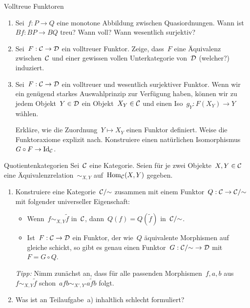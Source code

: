 \documentclass{uebblatt}
\begin{document}
\begin{aufgabe}{Volltreue Funktoren}
\begin{enumerate}
\item Sei~$f : P \to Q$ eine monotone Abbildung zwischen Quasiordnungen. Wann
ist~$Bf : BP \to BQ$ treu? Wann voll? Wann wesentlich surjektiv?
\item Sei~$F : \mathcal{C} \to \mathcal{D}$ ein volltreuer Funktor. Zeige, dass~$F$ eine Äquivalenz
zwischen~$\mathcal{C}$ und einer gewissen vollen Unterkategorie von~$\mathcal{D}$ (welcher?)
induziert.
\item Sei~$F : \mathcal{C} \to \mathcal{D}$ ein volltreuer und wesentlich surjektiver Funktor.
Wenn wir ein genügend starkes Auswahlprinzip zur Verfügung haben, können wir zu
jedem Objekt~$Y \in \mathcal{D}$ ein Objekt~$X_Y \in \mathcal{C}$ und einen
Iso~$g_Y : F(X_Y) \to Y$ wählen.

Erkläre, wie die Zuordnung~$Y \mapsto X_Y$ einen Funktor definiert. Weise die
Funk\-tor\-axiome explizit nach. Konstruiere einen natürlichen
Isomorphismus~$G \circ F \to \mathrm{Id}_{\mathcal{C}}$.
\end{enumerate}
\end{aufgabe}

\begin{aufgabe}{Quotientenkategorien}
Sei~$\mathcal{C}$ eine Kategorie. Seien für je zwei Objekte~$X,Y \in \mathcal{C}$ eine
Äquivalenzrelation~$\sim_{X,Y}$ auf~$\mathrm{Hom}_{\mathcal{C}}(X,Y)$ gegeben.
\begin{enumerate}
\item Konstruiere eine Kategorie~$\mathcal{C}/{\sim}$ zusammen mit einem Funktor~$Q : \mathcal{C}
\to \mathcal{C}/{\sim}$ mit folgender universeller Eigenschaft:
\begin{itemize}
\item Wenn~$f \sim_{X,Y} \tilde f$ in~$\mathcal{C}$, dann~$Q(f) = Q(\tilde f)$ in~$\mathcal{C}/{\sim}$.
\item Ist~$F : \mathcal{C} \to \mathcal{D}$ ein Funktor, der wie~$Q$ äquivalente Morphismen auf gleiche
schickt, so gibt es genau einen Funktor~$G : \mathcal{C}/{\sim} \to \mathcal{D}$ mit~$F = G \circ
Q$.
\end{itemize}

\emph{Tipp:} Nimm zunächst an, dass für alle passenden Morphismen~$f,a,b$
aus~$f \sim_{X,Y} \tilde f$ schon~$afb \sim_{X',Y'} a\tilde fb$ folgt.

\item Was ist an Teilaufgabe~a) inhaltlich schlecht formuliert?
\end{enumerate}
\end{aufgabe}
\end{document}
